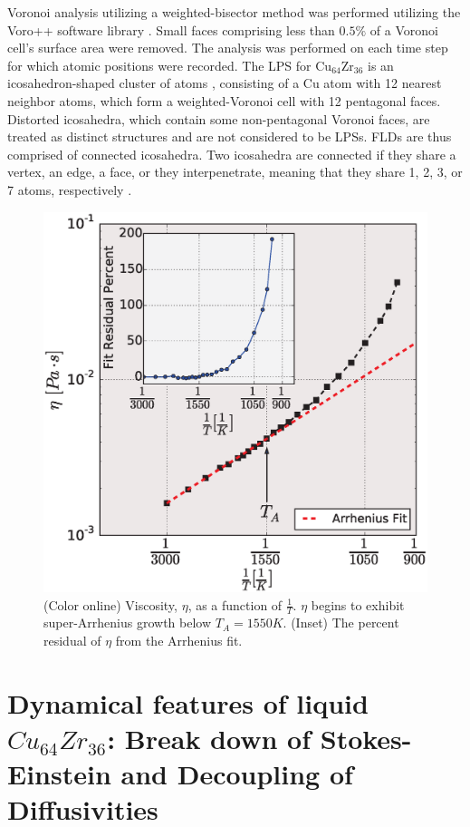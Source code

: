 \documentclass[aps,prl,preprint,showpacs,amsmath,floatfix,superscriptaddress]{revtex4}
\begin{document}
Voronoi analysis utilizing a weighted-bisector method was
performed utilizing the Voro++ software library
\cite{Rycroft2006}. Small faces comprising less than $0.5\%$ of a
Voronoi cell's surface area were removed. The analysis was
performed on each time step for which atomic positions were
recorded.
 The LPS for Cu$_{64}$Zr$_{36}$ is an icosahedron-shaped
cluster of atoms \cite{Liu2013, Cheng2008, Ding2014, Sheng2006},
consisting of a Cu atom with 12 nearest neighbor atoms, which form
a weighted-Voronoi cell with 12 pentagonal faces.
Distorted icosahedra, which contain some
non-pentagonal Voronoi faces, are treated as distinct structures
and are not considered to be LPSs. FLDs are thus comprised of
connected icosahedra. Two icosahedra are connected if they
share a vertex, an edge, a face, or they interpenetrate, meaning
that they share 1, 2, 3, or 7 atoms, respectively
\cite{Soklaski2013}.

\begin{figure}[t]
\includegraphics[scale=0.4]{viscosity.eps}
\caption{(Color online) Viscosity, $\eta$, as a function of
$\frac{1}{T}$. $\eta$ begins to exhibit super-Arrhenius growth
below $T_{A} = 1550 K$.  (Inset) The percent residual of $\eta$
from the Arrhenius fit.} \label{fig:viscosity}
\end{figure}


\section{Dynamical features of liquid $Cu_{64}Zr_{36}$: Break down of Stokes-Einstein and Decoupling of Diffusivities}
\end{document}
